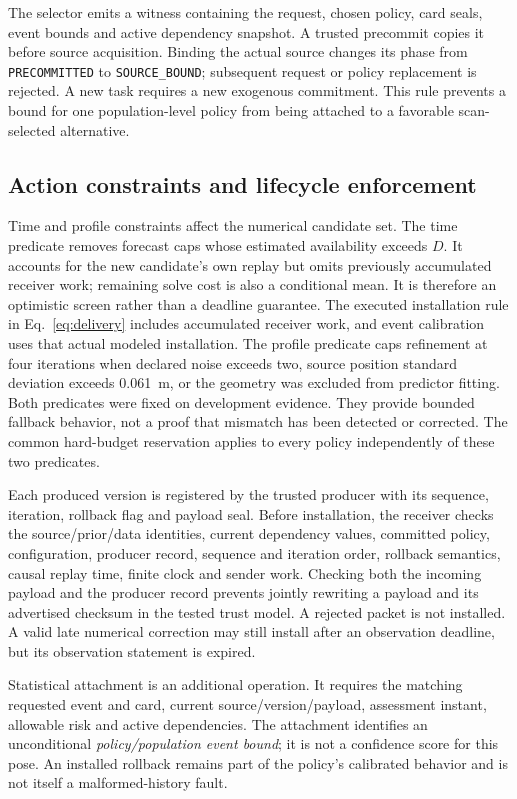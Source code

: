 The selector emits a witness containing the request, chosen policy, card seals, event bounds and active dependency snapshot. A trusted precommit copies it before source acquisition. Binding the actual source changes its phase from \texttt{PRECOMMITTED} to \texttt{SOURCE\_BOUND}; subsequent request or policy replacement is rejected. A new task requires a new exogenous commitment. This rule prevents a bound for one population-level policy from being attached to a favorable scan-selected alternative.

\subsection{Action constraints and lifecycle enforcement}
Time and profile constraints affect the numerical candidate set. The time predicate removes forecast caps whose estimated availability exceeds $D$. It accounts for the new candidate's own replay but omits previously accumulated receiver work; remaining solve cost is also a conditional mean. It is therefore an optimistic screen rather than a deadline guarantee. The executed installation rule in Eq.~\eqref{eq:delivery} includes accumulated receiver work, and event calibration uses that actual modeled installation. The profile predicate caps refinement at four iterations when declared noise exceeds two, source position standard deviation exceeds 0.061~m, or the geometry was excluded from predictor fitting. Both predicates were fixed on development evidence. They provide bounded fallback behavior, not a proof that mismatch has been detected or corrected. The common hard-budget reservation applies to every policy independently of these two predicates.

Each produced version is registered by the trusted producer with its sequence, iteration, rollback flag and payload seal. Before installation, the receiver checks the source/prior/data identities, current dependency values, committed policy, configuration, producer record, sequence and iteration order, rollback semantics, causal replay time, finite clock and sender work. Checking both the incoming payload and the producer record prevents jointly rewriting a payload and its advertised checksum in the tested trust model. A rejected packet is not installed. A valid late numerical correction may still install after an observation deadline, but its observation statement is expired.

Statistical attachment is an additional operation. It requires the matching requested event and card, current source/version/payload, assessment instant, allowable risk and active dependencies. The attachment identifies an unconditional \emph{policy/population event bound}; it is not a confidence score for this pose. An installed rollback remains part of the policy's calibrated behavior and is not itself a malformed-history fault.

